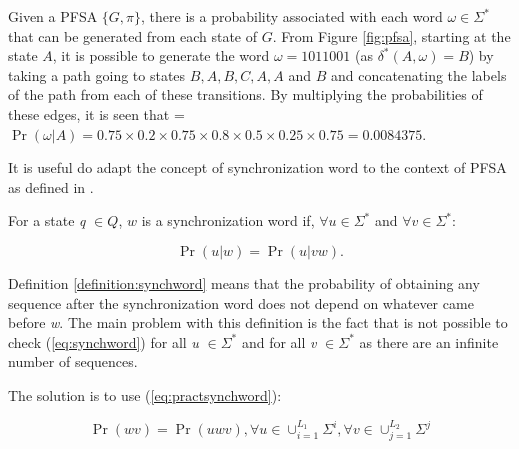 {Given a PFSA $\{G, \pi\}$, there is a probability associated with each word $\omega \in \Sigma^*$ that can be generated from each state of $G$. From Figure \ref{fig:pfsa}, starting at the state $A$, it is possible to generate the word $\omega = 1011001$ (as $\delta^*(A, \omega) = B$) by taking a path going to states $B,A,B,C,A,A$ and $B$ and concatenating the labels of the path from each of these transitions. By multiplying the probabilities of these edges, it is seen that  = $\Pr (\omega |A) = 0.75\times0.2\times0.75\times0.8\times0.5\times0.25\times0.75 = 0.0084375$.

It is useful do adapt the concept of synchronization word to the context of PFSA as defined in \citep{asok.11}.

\begin{definition}\label{definition:synchword}
For a state \textit{q} $\in Q$, $w$ is a synchronization word if, $\forall \textit{u} \in \Sigma^*$ and $\forall \textit{v} \in \Sigma^*$:

\begin{equation}
\Pr(\textit{u}|\textit{w}) = \Pr(\textit{u}|\textit{vw}).
\label{eq:synchword}
\end{equation}
\end{definition}

\noindent Definition \ref{definition:synchword} means that the probability of obtaining any sequence after the synchronization word does not depend on whatever came before \textit{w}. The main problem with this definition is the fact that is not possible to check (\ref{eq:synchword}) for all \textit{u} $\in \Sigma^*$ and for all \textit{v} $\in \Sigma^*$ as there are an infinite number of sequences.


The solution is to use (\ref{eq:practsynchword}):

\begin{equation}
\Pr(\textit{wv}) = \Pr(\textit{uwv}), \forall u \in \cup_{i=1}^{L_1}\Sigma^i, \forall v \in \cup_{j=1}^{L_2}\Sigma^j  
\label{eq:practsynchword}
\end{equation}

}

